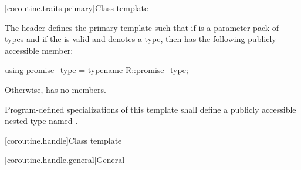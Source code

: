 [coroutine.traits.primary]{Class template }

\pnum
The header  defines the primary template
 such that
if  is a parameter pack of types and
if the   is valid and
denotes a type,
then  has the following publicly
accessible member:

\begin{codeblock}
using promise_type = typename R::promise_type;
\end{codeblock}

Otherwise,  has no members.

\pnum
Program-defined specializations of this template shall define a publicly
accessible nested type named .

[coroutine.handle]{Class template }

[coroutine.handle.general]{General}

